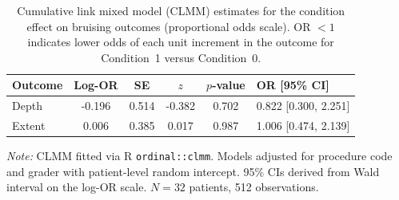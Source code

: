 \begin{table}[htbp]
\centering
\caption{Cumulative link mixed model (CLMM) estimates for the condition effect on bruising outcomes (proportional odds scale). OR $< 1$ indicates lower odds of each unit increment in the outcome for Condition~1 versus Condition~0.}
\label{tab:clmm}
\begin{tabular}{l S[table-format=-1.3] S[table-format=1.3] S[table-format=-1.3] S[table-format=1.3] l}
\toprule
{Outcome} & {Log-OR} & {SE} & {$z$} & {$p$-value} & {OR [95\% CI]} \\
\midrule
Depth  & -0.196 & 0.514 & -0.382 & 0.702 & 0.822 [0.300, 2.251] \\
Extent &  0.006 & 0.385 &  0.017 & 0.987 & 1.006 [0.474, 2.139] \\
\bottomrule
\end{tabular}
\smallskip

\noindent\textit{Note:} CLMM fitted via R \texttt{ordinal::clmm}. Models adjusted for procedure code and grader with patient-level random intercept. 95\% CIs derived from Wald interval on the log-OR scale. $N = 32$ patients, 512 observations.
\end{table}
